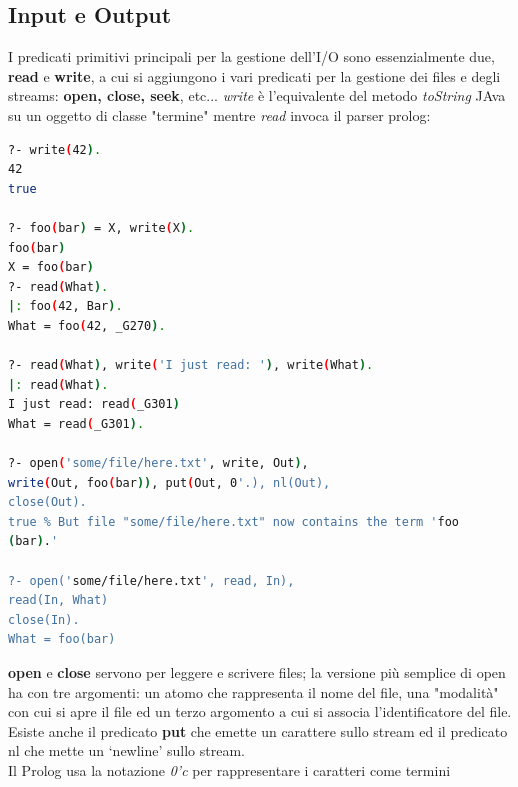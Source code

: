 \documentclass[a4paper,12pt, oneside]{book}
\begin{document}
\subsection{Input e Output}
I predicati primitivi principali per la gestione dell'I/O sono
essenzialmente due, \textbf{read} e \textbf{write}, a cui si aggiungono i vari predicati per la gestione dei files e degli streams: \textbf{open, close, seek}, etc...
\textit{write} è l'equivalente del metodo \textit{toString} JAva su un oggetto di classe "termine" mentre \textit{read} invoca il parser prolog:
\begin{shaded}
\begin{lstlisting}[language=bash]
?- write(42).
42
true

?- foo(bar) = X, write(X).
foo(bar)
X = foo(bar)
?- read(What).
|: foo(42, Bar).
What = foo(42, _G270).

?- read(What), write('I just read: '), write(What).
|: read(What).
I just read: read(_G301)
What = read(_G301).

?- open('some/file/here.txt', write, Out),
write(Out, foo(bar)), put(Out, 0'.), nl(Out),
close(Out).
true % But file "some/file/here.txt" now contains the term 'foo
(bar).'

?- open('some/file/here.txt', read, In),
read(In, What)
close(In).
What = foo(bar)
\end{lstlisting}
\end{shaded}
\textbf{open} e \textbf{close} servono per leggere e scrivere files; la versione più semplice di open ha con tre argomenti: un atomo che rappresenta il nome del file, una "modalità" con cui si apre il file ed un terzo argomento a cui si associa l'identificatore del file.\\
Esiste anche il predicato \textbf{put} che emette un carattere sullo stream ed il predicato nl che mette un ‘newline' sullo stream.\\
Il Prolog usa la notazione \textit{0'c} per rappresentare i caratteri come termini
\end{document}
